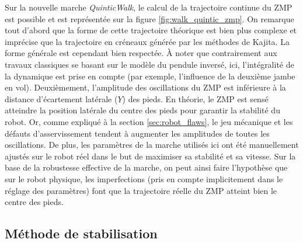 Sur la nouvelle marche \textit{QuinticWalk}, le calcul de
la trajectoire continue du ZMP est possible et est représentée
sur la figure \ref{fig:walk_quintic_zmp}.
On remarque tout d'abord que la forme de cette trajectoire théorique 
est bien plus complexe et imprécise que la trajectoire en \og créneaux \fg 
générée par les méthodes de Kajita.
La forme générale est cependant bien respectée.
À noter que contrairement aux travaux classiques se basant
sur le modèle du pendule inversé, ici, 
l'intégralité de la dynamique est prise en compte (par exemple, l'influence
de la deuxième jambe en vol).
Deuxièmement, l'amplitude des oscillations du ZMP est inférieure
à la distance d'écartement latérale ($Y$) des pieds.
En théorie, le ZMP est sensé atteindre la position latérale du centre 
des pieds pour garantir la stabilité du robot.
Or, comme expliqué à la section \ref{sec:robot_flaws}, le jeu mécanique et les
défauts d'asservissement tendent à augmenter les amplitudes de toutes les oscillations.
De plus, les paramètres de la marche utilisés ici ont été manuellement ajustés 
sur le robot réel dans le but de maximiser sa stabilité et sa vitesse.
Sur la base de la robustesse effective de la marche, 
on peut ainsi faire l'hypothèse que sur le robot physique, les imperfections 
(pris en compte implicitement dans le réglage des paramètres) font que 
la trajectoire réelle du ZMP atteint bien le centre des pieds.

\subsection{Méthode de stabilisation\label{sec:walk_stabilization}}

